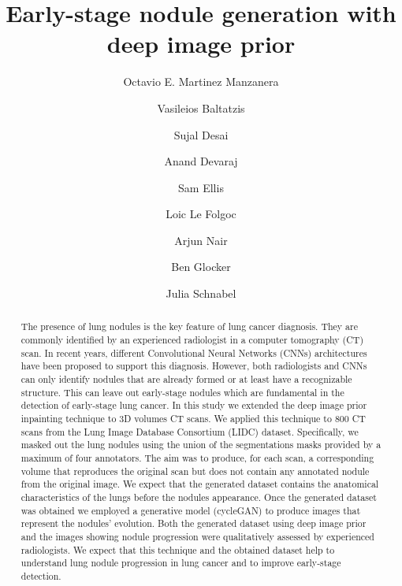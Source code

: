 \documentclass[runningheads]{llncs}
\begin{document}
%
\title{Early-stage nodule generation with deep image prior}
%
%
\author{Octavio E. Martinez Manzanera \and
Vasileios Baltatzis \and
Sujal Desai \and
Anand Devaraj \and
Sam Ellis \and
Loic Le Folgoc \and
Arjun Nair \and
Ben Glocker \and
Julia Schnabel}
%
%
%
\maketitle              %
%
\begin{abstract}
The presence of lung nodules is the key feature of lung cancer diagnosis. They are commonly identified  by an experienced radiologist in a computer tomography (CT) scan. In recent years, different Convolutional Neural Networks (CNNs) architectures have been proposed to support this diagnosis. However, both radiologists and CNNs can only identify nodules that are already formed or at least have a recognizable structure. This can leave out early-stage nodules which are fundamental in the detection of early-stage lung cancer. In this study we extended the deep image prior inpainting technique to 3D volumes CT scans. We applied this technique to 800 CT scans from the Lung Image Database Consortium (LIDC) dataset. Specifically, we masked out the lung nodules using the union of the segmentations masks provided by a maximum of four annotators. The aim was to produce, for each scan, a corresponding volume that reproduces the original scan but does not contain any annotated nodule from the original image. We expect that the generated dataset contains the anatomical characteristics of the lungs before the nodules appearance. Once the generated dataset was obtained we employed a generative model (cycleGAN) to produce images that represent the nodules' evolution. Both the generated dataset using deep image prior and the images showing nodule progression were qualitatively assessed by experienced radiologists. We expect that this technique and the obtained dataset help to understand lung nodule progression in lung cancer and to improve early-stage detection.

\end{abstract}
%
%
%
\end{document}
